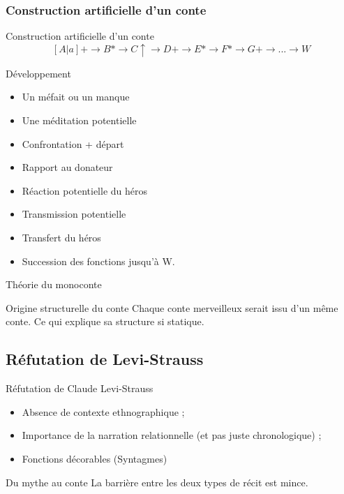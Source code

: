 \documentclass{beamer}
\begin{document}
\subsubsection{Construction artificielle d'un conte}
\begin{frame}{Construction artificielle d'un conte}
  $$ [A|a]+ \rightarrow B* \rightarrow C\uparrow \rightarrow D+ \rightarrow E*  \rightarrow F*  \rightarrow G+  \rightarrow ... \rightarrow W $$
  \scriptsize
  \begin{block}{Développement}
    \begin{itemize}
      \item Un méfait ou un manque 
      \item Une méditation potentielle
      \item Confrontation + départ 
      \item Rapport au donateur
      \item Réaction potentielle du héros
      \item Transmission potentielle
      \item Transfert du héros
      \item Succession des fonctions jusqu'à W.
        
    \end{itemize}
    \normalsize
  \end{block}
\end{frame}

\begin{frame}{Théorie du monoconte}
  \begin{block}{Origine structurelle du conte}
    Chaque conte merveilleux serait issu d'un même conte. Ce qui explique sa structure si statique.
  \end{block}
\end{frame}


\subsection{Réfutation de Levi-Strauss}
\begin{frame}{Réfutation de Claude Levi-Strauss}
  \begin{itemize}
    \item Absence de contexte ethnographique ;
    \item Importance de la narration relationnelle (et pas juste chronologique) ;
    \item Fonctions décorables (Syntagmes)
  \end{itemize}
  \begin{block}{Du mythe au conte}
    La barrière entre les deux types de récit est mince.
  \end{block}
\end{frame}
\end{document}

